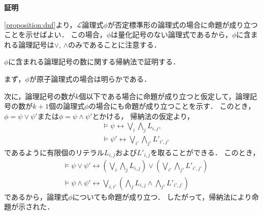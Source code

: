 \documentclass[uplatex, dvipdfmx]{jsarticle}
\makeatletter
\numberwithin{equation}{section}
\renewenvironment{proof}[1][\proofname]{\par
  \pushQED{\qed}%
  \normalfont \topsep6\p@\@plus6\p@\relax
  \trivlist
  \item\relax
  {\bfseries
  #1\@addpunct{.}}\hspace\labelsep\ignorespaces
}{
  \popQED\endtrivlist\@endpefalse
}
\theoremstyle{definition}
\renewcommand{\proofname}{\textbf{証明}}
\makeatother
\begin{document}
\begin{proof}

     \cref{proposition:dnf}より，$\mathcal{L}$論理式$\phi$が否定標準形の論理式の場合に命題が成り立つことを示せばよい．
     この場合，$\phi$は量化記号のない論理式であるから，$\phi$に含まれる論理記号は$\lor$, $\land$のみであることに注意する．
     
     $\phi$に含まれる論理記号の数に関する帰納法で証明する．

     まず，$\phi$が原子論理式の場合は明らかである．

     次に，論理記号の数が$k$個以下である場合に命題が成り立つと仮定して，論理記号の数が$k+1$個の論理式$\phi$の場合にも命題が成り立つことを示す．
     このとき，$\phi = \psi \lor \psi'$または$\phi = \psi \land \psi'$とかける，
     帰納法の仮定より，
     \begin{align}
          &\models \psi \leftrightarrow \bigvee_{i} \bigwedge_j L_{i,j},\\
          &\models \psi' \leftrightarrow \bigvee_{i'} \bigwedge_{j'} L'_{i',j'}
     \end{align}
     であるように有限個のリテラル$L_{i,j}$および$L'_{i,j}$を取ることができる．
     このとき，
     \begin{align}
          &\models \psi \lor  \psi' \leftrightarrow \left( \bigvee_i \bigwedge_j L_{i,j} \right) \vee \left( \bigvee_{i'} \bigwedge_{j'} L'_{i',j'}\right)\\
          &\models \psi \land \psi' \leftrightarrow \bigvee_{i, i'} \left(\bigwedge_j L_{i,j} \wedge \bigwedge_{j'} L'_{i',j'}\right)
     \end{align}
     であるから，論理式$\phi$についても命題が成り立つ．
     したがって，帰納法により命題が示された．
\end{proof}
\end{document}
